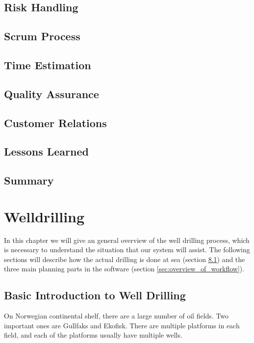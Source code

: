 \documentclass{report}
\begin{document}
\section{Risk Handling} \label{sec:risk_handling}
\section{Scrum Process} \label{sec:scrum_process}
\section{Time Estimation} \label{sec:time_est}
\section{Quality Assurance} \label{sec:qual_ass}
\section{Customer Relations} \label{sec:customer_relations}
\section{Lessons Learned} \label{sec:lessons_learned}
\section{Summary} \label{sec:summary_eva}













\appendix
\chapter{Welldrilling} \label{cha:welldrilling}
In this chapter we will give an general overview of the well drilling process, which is necessary to understand the situation that our system will assist. The following sections will describe how the actual drilling is done at sea (section \ref{sec:basic_introduction_to_well_drilling}) and the three main planning parts in the software (section \ref{sec:overview_of_workflow}).



\section{Basic Introduction to Well Drilling} \label{sec:basic_introduction_to_well_drilling}
On Norwegian continental shelf, there are a large number of oil fields. Two important ones are Gullfaks and Ekofisk. There are multiple platforms in each field, and each of the platforms usually have multiple wells.
\end{document}
